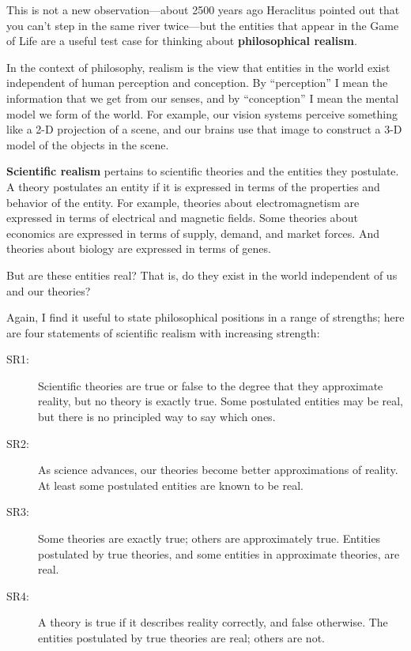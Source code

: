 \documentclass[12pt]{book}
\theoremstyle{exercise}
\begin{document}

This is not a new observation---about 2500 years ago Heraclitus
pointed out that you can't step in the same river twice---but the
entities that appear in the Game of Life are a useful test case for
thinking about {\bf philosophical realism}.


In the context of philosophy, realism is the view that entities
in the world exist independent of human perception and conception.
By ``perception'' I mean the information that we get from
our senses, and by ``conception'' I mean the mental model
we form of the world.  For example, our vision systems perceive
something like a 2-D projection of a scene, and our brains
use that image to construct a 3-D model of the objects in the
scene.


{\bf Scientific realism} pertains to scientific theories and the
entities they postulate.
A theory postulates an entity if it is
expressed in terms of the properties and behavior of the entity.  
For example, theories about electromagnetism are expressed in
terms of electrical and magnetic fields.  Some theories about economics
are expressed in terms of supply, demand, and market forces.
And theories about biology are expressed in terms of genes.

But are these entities real?  That is, do they exist in the world
independent of us and our theories?


Again, I find it useful to state philosophical positions in a range of
strengths; here are four statements of scientific realism with increasing
strength:

\begin{description}

\item[SR1:] Scientific theories are true or false to the degree that
  they approximate reality, but no theory is exactly true.  Some
  postulated entities may be real, but there is no principled way to
  say which ones.

\item[SR2:] As science advances, our theories become better
  approximations of reality.  At least some postulated entities are
  known to be real.

\item[SR3:] Some theories are exactly true; others are approximately
  true.  Entities postulated by true theories, and some entities
  in approximate theories, are real.

\item[SR4:] A theory is true if it describes reality correctly, and
  false otherwise.  The entities postulated by true theories are real;
  others are not.

\end{description}
\end{document}
